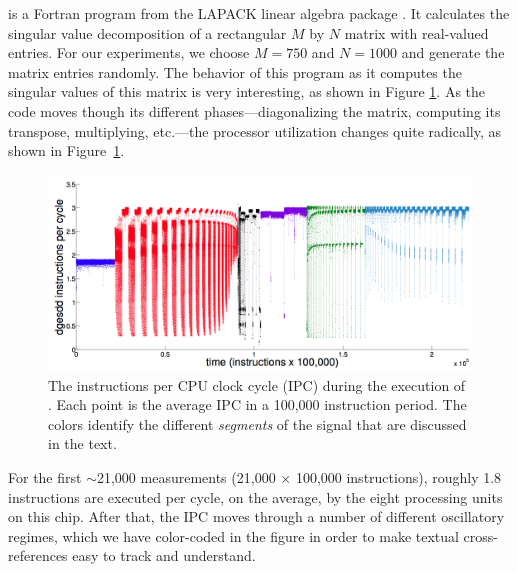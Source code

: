 \svd is a Fortran program from the LAPACK linear algebra package
\cite{lapack}.  It calculates the singular value decomposition of a
rectangular $M$ by $N$ matrix with real-valued entries.  For our experiments, we
choose $M=750$ and $N=1000$ and generate the matrix entries randomly.
% 
% 
The behavior of this program as it computes the singular values of
this matrix is very interesting, as shown in Figure
\ref{fig:svd-ts-colored}.  As the code moves though its different
phases---diagonalizing the matrix, computing its transpose,
multiplying, etc.---the processor utilization changes quite radically,
as shown in Figure~\ref{fig:svd-ts-colored}.
\begin{figure}[t]
    \centering
    \includegraphics[width=\columnwidth]{figs/SVD1RegimesColored}
    \caption{The instructions per CPU clock cycle (IPC) during the
      execution of \svd. Each point is the average IPC in a 100,000
      instruction period.  The colors identify the different {\sl
        segments} of the signal that are discussed in the text.}
    \label{fig:svd-ts-colored}
  \end{figure}
For the first $\sim$21,000 measurements (21,000 $\times$ 100,000
instructions), roughly 1.8 instructions are executed per cycle, on the
average, by the eight processing units on this chip.  After that, the
IPC moves through a number of different oscillatory regimes, which we
have color-coded in the figure in order to make textual
cross-references easy to track and understand.

